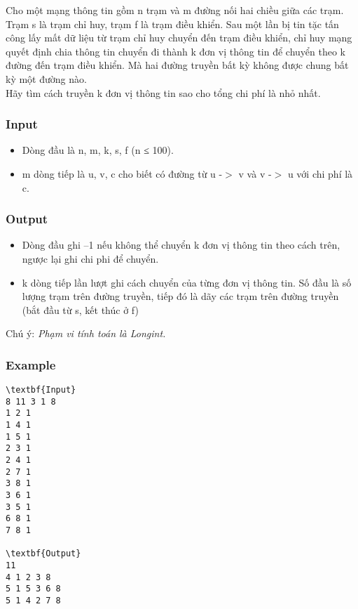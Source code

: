 

Cho một mạng thông tin gồm n trạm và m đường nối hai chiều giữa các trạm. Trạm s là trạm chỉ huy, trạm f là trạm điều khiển. Sau một lần bị tin tặc tấn công lấy mất dữ liệu từ trạm chỉ huy chuyển đến trạm điều khiển, chỉ huy mạng quyết định chia thông tin chuyển đi thành k đơn vị thông tin để chuyển theo k đường đến trạm điều khiển. Mà hai đường truyền bất kỳ không được chung bất kỳ một đường nào.
\\Hãy tìm cách truyền k đơn vị thông tin sao cho tổng chi phí là nhỏ nhất.

\subsubsection{Input}
\begin{itemize}
	\item Dòng đầu là n, m, k, s, f (n ≤ 100).
	\item m dòng tiếp là u, v, c cho biết có đường từ u -$>$ v và v -$>$ u với chi phí là c.
\end{itemize}

\subsubsection{Output}
\begin{itemize}
	\item Dòng đầu ghi –1 nếu không thể chuyển k đơn vị thông tin theo cách trên, ngược lại ghi chi phi để chuyển.
	\item k dòng tiếp lần lượt ghi cách chuyển của từng đơn vị thông tin. Số đầu là số lượng trạm trên đường truyền, tiếp đó là dãy các trạm trên đường truyền (bắt đầu từ s, kết thúc ở f)
\end{itemize}

Chú ý: \emph{ Phạm vi tính toán là Longint. }

\subsubsection{Example}
\begin{verbatim}
\textbf{Input}
8 11 3 1 8
1 2 1
1 4 1
1 5 1
2 3 1
2 4 1
2 7 1
3 8 1
3 6 1
3 5 1
6 8 1
7 8 1

\textbf{Output}
11
4 1 2 3 8
5 1 5 3 6 8
5 1 4 2 7 8

\end{verbatim}